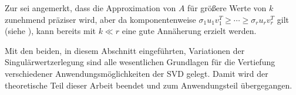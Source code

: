 Zur  sei angemerkt, dass die Approximation von \(A\) für größere Werte von \(k\) zunehmend präziser wird, aber da komponentenweise \(\sigma_1 u_1 v^{T}_1 \geq \cdots \geq \sigma_r u_r v^{T}_r\) gilt (siehe ), kann bereits mit \(k \ll r\) eine gute Annäherung erzielt werden. 

Mit den beiden, in diesem Abschnitt eingeführten, Variationen der Singulärwertzerlegung sind alle wesentlichen Grundlagen für die Vertiefung verschiedener Anwendungsmöglichkeiten der SVD gelegt.
Damit wird der theoretische Teil dieser Arbeit beendet und zum Anwendungsteil übergegangen.